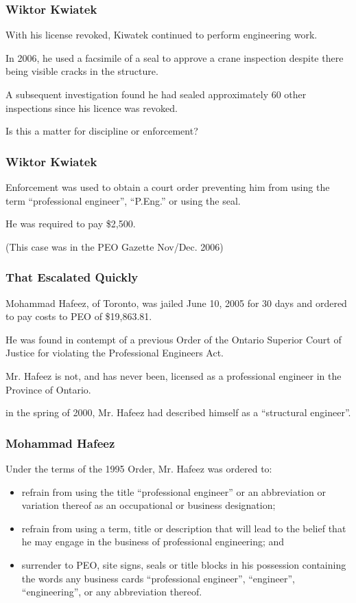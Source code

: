 \begin{frame}
\frametitle{Wiktor Kwiatek}

With his license revoked, Kiwatek continued to perform engineering work.

In 2006, he used a facsimile of a seal to approve a crane inspection despite there being visible cracks in the structure.

A subsequent investigation found he had sealed approximately 60 other inspections since his licence was revoked.

Is this a matter for discipline or enforcement?

\end{frame}



\begin{frame}
\frametitle{Wiktor Kwiatek}

Enforcement was used to obtain a court order preventing him from using the term ``professional engineer'', ``P.Eng.'' or using the seal.

He was required to pay \$2,500.

(This case was in the PEO Gazette Nov/Dec. 2006)

\end{frame}



\begin{frame}
\frametitle{That Escalated Quickly}


Mohammad Hafeez, of Toronto, was jailed June 10, 2005 for 30 days and ordered to pay costs to PEO of \$19,863.81. 

He was found in contempt of a previous Order of the Ontario Superior Court of Justice for violating the Professional Engineers Act. 

Mr. Hafeez is not, and has never been, licensed as a professional engineer in the Province of Ontario.

in the spring of 2000, Mr. Hafeez had described himself as a ``structural engineer''.  

\end{frame}



\begin{frame}
\frametitle{Mohammad Hafeez}

Under the terms of the 1995 Order, Mr. Hafeez was ordered to:
\begin{itemize}
\item refrain from using the title ``professional engineer'' or an abbreviation or variation thereof as an occupational or business designation;
\item refrain from using a term, title or description that will lead to the belief that he may engage in the business of professional engineering; and
\item surrender to PEO, site signs, seals or title blocks in his possession containing the words any business cards ``professional engineer'', ``engineer'', ``engineering'', or any abbreviation thereof.
\end{itemize}

\end{frame}





